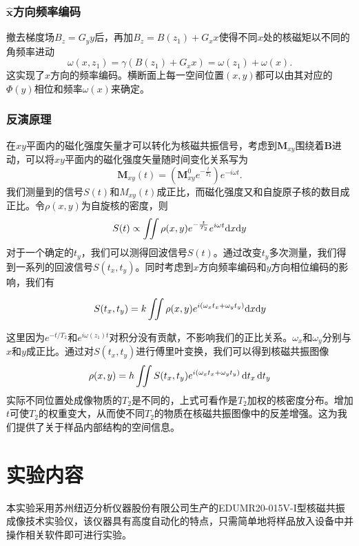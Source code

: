\documentclass[font=default]{mpltx}
\begin{document}
\subsubsection{$\hat{\bm{x}}$方向频率编码}

撤去梯度场$B_z = G_y y$后，再加$B_z = B(z_1)+G_x x$使得不同$x$处的核磁矩以不同的角频率进动
\begin{equation}
  \omega(x, z_1) = \gamma (B(z_1) + G_x x) = \omega(z_1) + \omega(x).
\end{equation}
这实现了$x$方向的频率编码。横断面上每一空间位置$(x,y)$都可以由其对应的$\Phi(y)$相位和频率$\omega(x)$来确定。

\subsubsection{反演原理}
在$xy$平面内的磁化强度矢量才可以转化为核磁共振信号，考虑到$\bm{M}_{xy}$围绕着$\bm{B}$进动，可以将$xy$平面内的磁化强度矢量随时间变化关系写为
\begin{equation}
  \bm{M}_{xy}(t)=(\bm{M}_{xy}^0e^{-\frac{t}{T_2}})e^{-i\omega t}.
\end{equation}
我们测量到的信号$S(t)$和$M_{xy}(t)$成正比，而磁化强度又和自旋原子核的数目成正比。令$\rho(x,y)$为自旋核的密度，则
\begin{equation}
  S(t) \propto \iint\rho(x, y)e^{-\frac{t}{T_2}} e^{i\omega t}{\rm d}x{\rm d}y
\end{equation}
对于一个确定的$t_y$，我们可以测得回波信号$S(t)$。通过改变$t_y$多次测量，我们得到一系列的回波信号$S(t_x, t_y)$。同时考虑到$x$方向频率编码和$y$方向相位编码的影响，我们有

\begin{equation}
S(t_x, t_y) =k \iint \rho(x, y) e^{i(\omega_x t_x + \omega_y t_y)}{\rm d}x {\rm d}y
\end{equation}

这里因为$e^{-t/T_2}$和$e^{i\omega(z_1)t}$对积分没有贡献，不影响我们的正比关系。$\omega_x$和$\omega_y$分别与$x$和$y$成正比。通过对$S(t_x, t_y)$进行傅里叶变换，我们可以得到核磁共振图像
\begin{equation}
  \rho(x,y)=h\iint S(t_x,t_y)e^{i(\omega_x t_x + \omega_y t_y)}\,{\rm d}t_x \,{\rm d}t_y
\end{equation}
实际不同位置处成像物质的$T_2$是不同的，上式可看作是$T_2$加权的核密度分布。增加$t$可使$T_2$的权重变大，从而使不同$T_2$的物质在核磁共振图像中的反差增强。这为我们提供了关于样品内部结构的空间信息。
\section{实验内容}
本实验采用苏州纽迈分析仪器股份有限公司生产的EDUMR20-015V-I型核磁共振成像技术实验仪，该仪器具有高度自动化的特点，只需简单地将样品放入设备中并操作相关软件即可进行实验。
\end{document}
